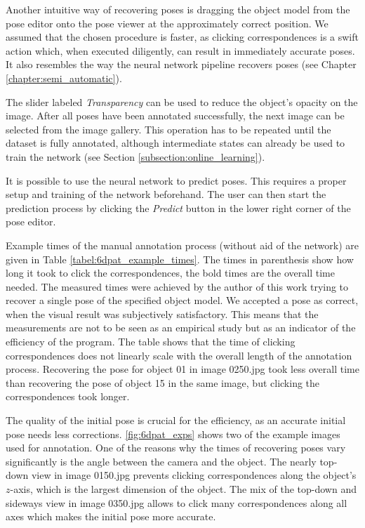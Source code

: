 Another intuitive way of recovering poses is dragging the object model from the pose editor onto the pose viewer at the approximately correct position. We assumed that the chosen procedure is faster, as clicking correspondences is a swift action which, when executed diligently, can result in immediately accurate poses. It also resembles the way the neural network pipeline recovers poses (see Chapter \ref{chapter:semi_automatic}).

The slider labeled \textit{Transparency} can be used to reduce the object's opacity on the image. After all poses have been annotated successfully, the next image can be selected from the image gallery. This operation has to be repeated until the dataset is fully annotated, although intermediate states can already be used to train the network (see Section \ref{subsection:online_learning}).

It is possible to use the neural network to predict poses. This requires a proper setup and training of the network beforehand. The user can then start the prediction process by clicking the \textit{Predict} button in the lower right corner of the pose editor.

Example times of the manual annotation process (without aid of the network) are given in Table \ref{tabel:6dpat_example_times}. The times in parenthesis show how long it took to click the correspondences, the bold times are the overall time needed. The measured times were achieved by the author of this work trying to recover a single pose of the specified object model. We accepted a pose as correct, when the visual result was subjectively satisfactory. This means that the measurements are not to be seen as an empirical study  but as an indicator of the efficiency of the program. The table shows that the time of clicking correspondences does not linearly scale with the overall length of the annotation process. Recovering the pose for object 01 in image 0250.jpg took less overall time than recovering the pose of object 15 in the same image, but clicking the correspondences took longer.

The quality of the initial pose is crucial for the efficiency, as an accurate initial pose needs less corrections. \fig \ref{fig:6dpat_exps} shows two of the example images used for annotation. One of the reasons why the times of recovering poses vary significantly is the angle between the camera and the object. The nearly top-down view in image 0150.jpg prevents clicking correspondences along the object's $z$-axis, which is the largest dimension of the object. The mix of the top-down and sideways view in image 0350.jpg allows to click many correspondences along all axes which makes the initial pose more accurate. 

